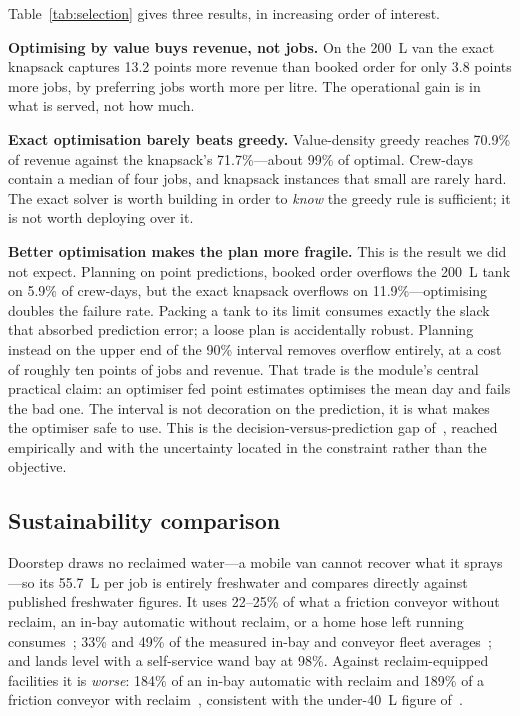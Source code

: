 \documentclass[conference]{IEEEtran}
\begin{document}
Table~\ref{tab:selection} gives three results, in increasing order of interest.

\textbf{Optimising by value buys revenue, not jobs.} On the 200~L van the exact knapsack
captures 13.2 points more revenue than booked order for only 3.8 points more jobs, by preferring
jobs worth more per litre. The operational gain is in what is served, not how much.

\textbf{Exact optimisation barely beats greedy.} Value-density greedy reaches 70.9\% of revenue
against the knapsack's 71.7\%---about 99\% of optimal. Crew-days contain a median of four jobs,
and knapsack instances that small are rarely hard. The exact solver is worth building in order
to \emph{know} the greedy rule is sufficient; it is not worth deploying over it.

\textbf{Better optimisation makes the plan more fragile.} This is the result we did not expect.
Planning on point predictions, booked order overflows the 200~L tank on 5.9\% of crew-days, but
the exact knapsack overflows on 11.9\%---optimising doubles the failure rate. Packing a tank to
its limit consumes exactly the slack that absorbed prediction error; a loose plan is
accidentally robust. Planning instead on the upper end of the 90\% interval removes overflow
entirely, at a cost of roughly ten points of jobs and revenue. That trade is the module's
central practical claim: an optimiser fed point estimates optimises the mean day and fails the
bad one. The interval is not decoration on the prediction, it is what makes the optimiser safe
to use. This is the decision-versus-prediction gap of~\cite{elmachtoub2022spo}, reached
empirically and with the uncertainty located in the constraint rather than the objective.

\subsection{Sustainability comparison}

Doorstep draws no reclaimed water---a mobile van cannot recover what it sprays---so its 55.7~L
per job is entirely freshwater and compares directly against published freshwater figures. It
uses 22--25\% of what a friction conveyor without reclaim, an in-bay automatic without reclaim,
or a home hose left running consumes~\cite{epa2012watersense,epa_hose}; 33\% and 49\% of the
measured in-bay and conveyor fleet averages~\cite{ica2018water}; and lands level with a
self-service wand bay at 98\%. Against reclaim-equipped facilities it is \emph{worse}: 184\% of
an in-bay automatic with reclaim and 189\% of a friction conveyor with
reclaim~\cite{epa2012watersense}, consistent with the under-40~L figure
of~\cite{zaneti2013reuse}.
\end{document}
